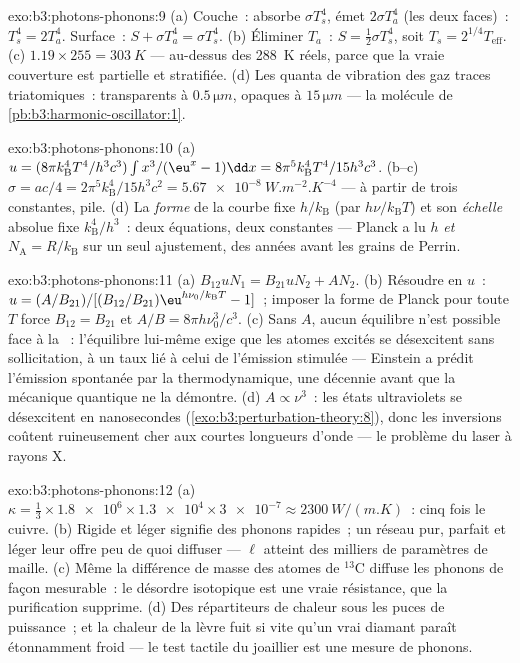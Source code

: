 \begin{solution}{exo:b3:photons-phonons:9}
(a) Couche~: absorbe $\sigma T_s^4$, émet $2\sigma T_a^4$ (les deux
faces)~: $T_s^4 = 2T_a^4$. Surface~: $S + \sigma T_a^4 = \sigma
T_s^4$. (b) Éliminer $T_a$~: $S = \tfrac12\sigma T_s^4$, soit
$T_s = 2^{1/4}T_{\text{eff}}$. (c) $1.19 \times 255 =
\qty{303}{K}$ --- au-dessus des \qty{288}{K} réels, parce que la
vraie couverture est partielle et stratifiée. (d) Les quanta de
vibration des gaz traces triatomiques~: transparents à
$0.5\,\unit{\micro m}$, opaques à $15\,\unit{\micro m}$ ---
la molécule de \cref{pb:b3:harmonic-oscillator:1}.
\end{solution}

\begin{solution}{exo:b3:photons-phonons:10}
(a) $u = (8\pi k_{\text{B}}^4T^4/h^3c^3)\int x^3/(\eu^x - 1)\dd x
= 8\pi^5k_{\text{B}}^4T^4/15h^3c^3$. (b--c) $\sigma = ac/4 =
2\pi^5k_{\text{B}}^4/15h^3c^2 = \qty{5.67e-8}{W.m^{-2}.K^{-4}}$
--- à partir de trois constantes, pile. (d) La \emph{forme} de la
courbe fixe $h/k_{\text{B}}$ (par $h\nu/k_{\text{B}}T$) et son
\emph{échelle} absolue fixe $k_{\text{B}}^4/h^3$~: deux équations,
deux constantes --- Planck a lu $h$ \emph{et} $N_{\text{A}} =
R/k_{\text{B}}$ sur un seul ajustement, des années avant les
grains de Perrin.
\end{solution}

\begin{solution}{exo:b3:photons-phonons:11}
(a) $B_{12}uN_1 = B_{21}uN_2 + AN_2$. (b) Résoudre en $u$~:
$u = (A/B_{21})/[(B_{12}/B_{21})\eu^{h\nu_0/k_{\text{B}}T} - 1]$~;
imposer la forme de Planck pour toute $T$ force $B_{12} = B_{21}$ et
$A/B = 8\pi h\nu_0^3/c^3$. (c) Sans $A$, aucun équilibre n'est
possible face à la ~: l'équilibre lui-même exige que
les atomes excités se désexcitent sans sollicitation, à un taux lié
à celui de l'émission stimulée --- Einstein a prédit l'émission
spontanée par la thermodynamique, une décennie avant que la
mécanique quantique ne la démontre. (d) $A \propto
\nu^3$~: les états ultraviolets se désexcitent en nanosecondes
(\cref{exo:b3:perturbation-theory:8}), donc les inversions coûtent
ruineusement cher aux courtes longueurs d'onde --- le problème du
laser à rayons X.
\end{solution}

\begin{solution}{exo:b3:photons-phonons:12}
(a) $\kappa = \tfrac13 \times \num{1.8e6} \times \num{1.3e4}
\times \num{3e-7} \approx \qty{2300}{W/(m.K)}$~: cinq fois le
cuivre. (b) Rigide et léger signifie des phonons rapides~; un
réseau pur, parfait et léger leur offre peu de quoi diffuser ---
$\ell$ atteint des milliers de paramètres de maille. (c) Même la
différence de masse des atomes de $^{13}$C diffuse les phonons de
façon mesurable~: le désordre isotopique est une vraie résistance,
que la purification supprime. (d) Des répartiteurs de chaleur sous
les puces de puissance~; et la chaleur de la lèvre fuit si vite
qu'un vrai diamant paraît étonnamment froid --- le test tactile du
joaillier est une mesure de phonons.
\end{solution}

